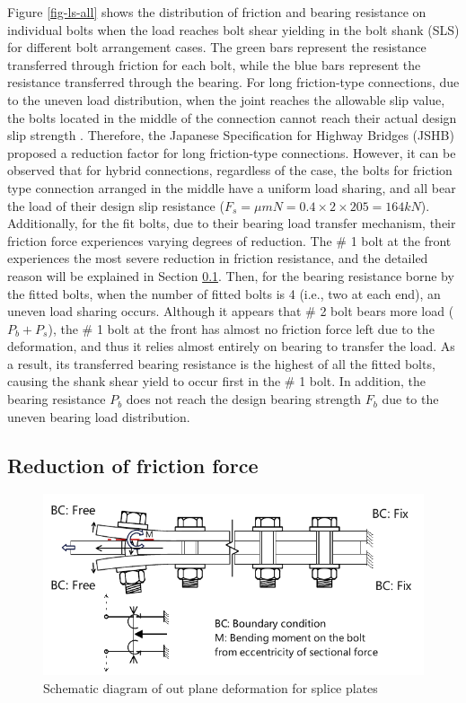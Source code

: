 Figure \ref{fig-ls-all} shows the distribution of friction and bearing resistance on individual bolts when the load reaches bolt shear yielding in the bolt shank (SLS) for different bolt arrangement cases. The green bars represent the resistance transferred through friction for each bolt, while the blue bars represent the resistance transferred through the bearing. For long friction-type connections, due to the uneven load distribution, when the joint reaches the allowable slip value, the bolts located in the middle of the connection cannot reach their actual design slip strength \cite{KAMEI2000,peng2013}. Therefore, the Japanese Specification for Highway Bridges (JSHB) \cite{douji2017} proposed a reduction factor for long friction-type connections. However, it can be observed that for hybrid connections, regardless of the case, the bolts for friction type connection arranged in the middle have a uniform load sharing, and all bear the load of their design slip resistance ($F_s = \mu m N=0.4\times2\times205 = 164 kN$). Additionally, for the fit bolts, due to their bearing load transfer mechanism, their friction force experiences varying degrees of reduction. The \# 1 bolt at the front experiences the most severe reduction in friction resistance, and the detailed reason will be explained in Section \ref{sec-decoff}. Then, for the bearing resistance borne by the fitted bolts, when the number of fitted bolts is 4 (i.e., two at each end), an uneven load sharing occurs. Although it appears that \# 2 bolt bears more load ($P_b + P_s$), the \# 1 bolt at the front has almost no friction force left due to the deformation, and thus it relies almost entirely on bearing to transfer the load. As a result, its transferred bearing resistance is the highest of all the fitted bolts, causing the shank shear yield to occur first in the \# 1 bolt. In addition, the bearing resistance $P_{b}$ does not reach the design bearing strength $F_b$ due to the uneven bearing load distribution.




\subsection{Reduction of friction force}
\label{sec-decoff}

\begin{figure}
    \centering
    \includegraphics[width=0.85\linewidth]{imgs/ch7/OP-def.pdf}
    \caption{Schematic diagram of out plane deformation for splice plates}
    \label{fig-OP-def}
\end{figure}


